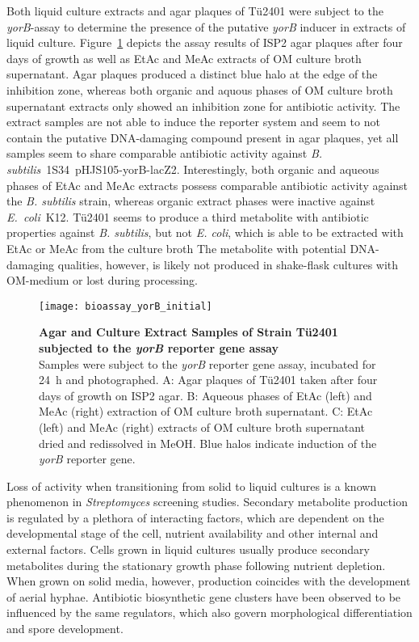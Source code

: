 Both liquid culture extracts and agar plaques of Tü2401 were subject to the \emph{yorB}-assay to determine the presence of the putative \emph{yorB} inducer in extracts of liquid culture.
Figure~\ref{fig:results_yorB_initial} depicts the assay results of ISP2 agar plaques after four days of growth as well as EtAc and MeAc extracts of OM culture broth supernatant.
Agar plaques produced a distinct blue halo at the edge of the inhibition zone, whereas both organic and aquous phases of OM culture broth supernatant extracts only showed an inhibition zone for antibiotic activity.
The extract samples are not able to induce the reporter system and seem to not contain the putative DNA-damaging compound present in agar plaques, yet all samples seem to share comparable antibiotic activity against \textit{B. subtilis}~1S34~pHJS105-yorB-lacZ2.
Interestingly, both organic and aqueous phases of EtAc and MeAc extracts possess comparable antibiotic activity against the \emph{B. subtilis} strain, whereas organic extract phases were inactive against \emph{E.~coli}~K12.
Tü2401 seems to produce a third metabolite with antibiotic properties against \emph{B. subtilis}, but not \emph{E. coli}, which is able to be extracted with EtAc or MeAc from the culture broth
The metabolite with potential DNA-damaging qualities, however, is likely not produced in shake-flask cultures with OM-medium or lost during processing.

\begin{figure}[htbp]
	\centering
	\texttt{[image: bioassay\_yorB\_initial]}
	\caption[Agar and Culture Extract Samples of Strain Tü2401 subjected to the \emph{yorB} reporter gene assay]{%
		\textbf{Agar and Culture Extract Samples of Strain Tü2401 subjected to the \emph{yorB} reporter gene assay}\\
		Samples were subject to the \emph{yorB} reporter gene assay, incubated for 24~h and photographed.
		A: Agar plaques of Tü2401 taken after four days of growth on ISP2 agar.
		B: Aqueous phases of EtAc (left) and MeAc (right) extraction of OM culture broth supernatant.
		C: EtAc (left) and MeAc (right) extracts of OM culture broth supernatant dried and redissolved in MeOH.
		Blue halos indicate induction of the \emph{yorB} reporter gene.
	}
	\label{fig:results_yorB_initial}
\end{figure}

Loss of activity when transitioning from solid to liquid cultures is a known phenomenon in \emph{Streptomyces} screening studies.\autocite{Pickup1993,SHOMURA1979}
Secondary metabolite production is regulated by a plethora of interacting factors, which are dependent on the developmental stage of the cell, nutrient availability and other internal and external factors.\autocite{Cihak2017,Jones2017,Gao2012,Bibb2005}
Cells grown in liquid cultures usually produce secondary metabolites during the stationary growth phase following nutrient depletion.\autocite{Bibb2005}
When grown on solid media, however, production coincides with the development of aerial hyphae.
Antibiotic biosynthetic gene clusters have been observed to be influenced by the same regulators, which also govern morphological differentiation and spore development.\autocite{Ostash2011,DenHengst2010}

